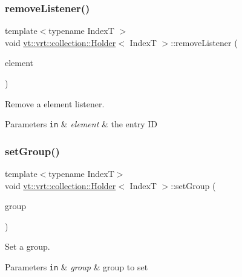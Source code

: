 \subsubsection{\texorpdfstring{remove\+Listener()}{removeListener()}}
{\footnotesize\ttfamily template$<$typename IndexT $>$ \\
void \hyperlink{structvt_1_1vrt_1_1collection_1_1_holder}{vt\+::vrt\+::collection\+::\+Holder}$<$ IndexT $>$\+::remove\+Listener (\begin{DoxyParamCaption}\item[{int}]{element }\end{DoxyParamCaption})}



Remove a element listener. 


\begin{DoxyParams}[1]{Parameters}
\mbox{\tt in}  & {\em element} & the entry ID \\
\hline
\end{DoxyParams}
\mbox{\label{structvt_1_1vrt_1_1collection_1_1_holder_a69156fa0708db3d9d017c0693653cef4}} 
\subsubsection{\texorpdfstring{set\+Group()}{setGroup()}}
{\footnotesize\ttfamily template$<$typename IndexT$>$ \\
void \hyperlink{structvt_1_1vrt_1_1collection_1_1_holder}{vt\+::vrt\+::collection\+::\+Holder}$<$ IndexT $>$\+::set\+Group (\begin{DoxyParamCaption}\item[{\hyperlink{namespacevt_a27b5e4411c9b6140c49100e050e2f743}{Group\+Type} const \&}]{group }\end{DoxyParamCaption})\hspace{0.3cm}{\ttfamily [inline]}}



Set a group. 


\begin{DoxyParams}[1]{Parameters}
\mbox{\tt in}  & {\em group} & group to set \\
\hline
\end{DoxyParams}
\mbox{\label{structvt_1_1vrt_1_1collection_1_1_holder_a4ca1b81daf55017c6f4a4cd584b761d5}} 
